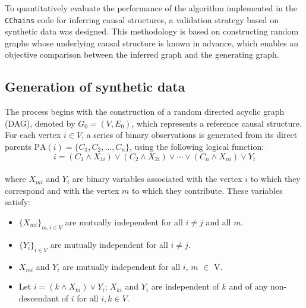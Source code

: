 \documentclass[12pt,a4paper]{report}
\begin{document}
To quantitatively evaluate the performance of the algorithm implemented in the \texttt{CChains} code for inferring causal structures, a validation strategy based on synthetic data was designed. This methodology is based on constructing random graphs whose underlying causal structure is known in advance, which enables an objective comparison between the inferred graph and the generating graph.

\subsection*{Generation of synthetic data}

The process begins with the construction of a random directed acyclic graph (DAG), denoted by \( G_0 = (V, E_0) \), which represents a reference causal structure. For each vertex \( i \in V \), a series of binary observations is generated from its direct parents \( \text{PA}(i) = \{C_1, C_2, \dots, C_n\} \), using the following logical function:
\begin{equation}
i = (C_1 \land X_{1i}) \lor (C_2 \land X_{2i}) \lor \cdots \lor (C_n \land X_{ni}) \lor Y_{i}
\label{eq:logic}
\end{equation} 
\\
where \( X_{mi} \) and \( Y_{i} \) are binary variables associated with the vertex $i$ to which they correspond and with the vertex $m$ to which they contribute. These variables satisfy:
\begin{itemize}
\item \( \{X_{mi}\}_{m,i \in V} \) are mutually independent for all \( i \neq j \) and all $m$.
\item \( \{Y_{i}\}_{i \in V} \) are mutually independent for all \( i \neq j \). 
\item  $X_{mi}$ and $Y_{i}$ are mutually independent for all \( i \), $m$ $\in$ V.
\item Let $i = (k \land X_{ki}) \lor Y_i $; $X_{ki}$ and $Y_i$ are independent of $k$ and of any non-descendant of $i$ for all $i,k \in V$.
\end{itemize}
\end{document}
